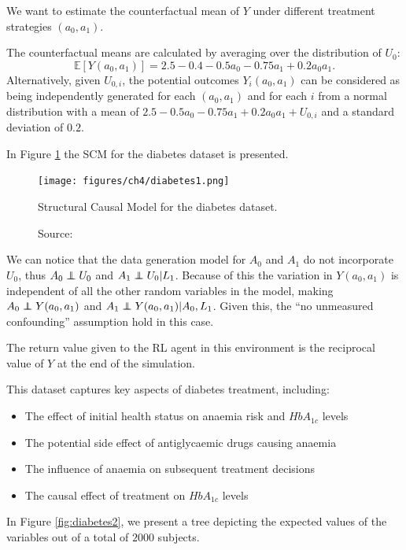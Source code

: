 We want to estimate the counterfactual mean of \( Y \) under
different treatment strategies \( (a_0, a_1) \).

The counterfactual means are calculated by averaging over the
distribution of \( U_0 \):
\begin{equation}
\mathbb{E}[Y(a_0, a_1)] = 2.5 - 0.4 - 0.5a_0 - 0.75a_1 + 0.2a_0a_1.
\end{equation}
Alternatively, given \( U_{0,i} \), the potential outcomes
\( Y_i(a_0, a_1) \) can be considered as being independently
generated for each \((a_0, a_1)\) and for each \(i\) from
a normal distribution with a mean of
\( 2.5 - 0.5a_0 - 0.75a_1 + 0.2a_0a_1 + U_{0,i} \)
and a standard deviation of $0.2$.

In Figure \ref{fig:diabetes1} the SCM for the diabetes dataset
is presented.
\begin{figure}[h]
    \centering
    \texttt{[image: figures/ch4/diabetes1.png]}
    \caption{Structural Causal Model for the diabetes dataset.}
    \vspace{-10px}
    \caption*{\scriptsize{Source: \cite{sim2012}}}
    \label{fig:diabetes1}
\end{figure}
We can notice that the data generation model for $A_0$ and $A_1$
do not incorporate $U_0$, thus $A_0 \independent U_0$ and
$A_1 \independent U_0 | L_1$. Because of this
the variation in $Y(a_0,a_1)$ is independent
of all the other random variables in the model,
making $A_0 \independent Y(a_0,a_1)$ and
$A_1 \independent Y(a_0,a_1) | A_0, L_1$.
Given this, the ``no unmeasured confounding'' assumption
hold in this case.

The return value given to the RL agent in this environment
is the reciprocal value of \( Y \) at the end of the simulation.

This dataset captures key aspects of diabetes treatment, including:
\begin{itemize}
    \item The effect of initial health status on anaemia risk
    and $HbA_{1c}$ levels
    \item The potential side effect of antiglycaemic drugs causing anaemia
    \item The influence of anaemia on subsequent treatment decisions
    \item The causal effect of treatment on $HbA_{1c}$ levels
\end{itemize}
In Figure \ref{fig:diabetes2}, we present a tree
depicting the expected values of the variables out of
a total of $2000$ subjects.

